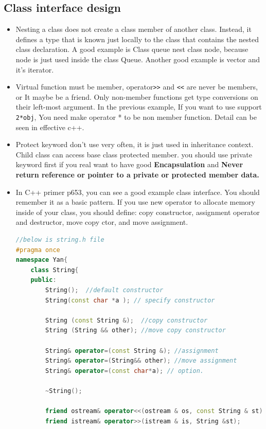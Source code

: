 \documentclass[a4paper,11pt,twoside]{book}
\begin{document}
\subsection{Class interface design}
\begin{itemize}
	
	\item Nesting a class does not create a class member of another class. Instead, it defines a type that is known just locally to the class that contains the nested class declaration.  A good example is Class queue nest class node,  because node is just used inside the class Queue. Another good example is vector and it's iterator.
	
	\item Virtual function must be member, operator\verb=>>= and \verb=<<= are never be members, or It maybe be a friend. Only non-member functions get type conversions on their left-most argument.  In the previous example, If you want to use support \texttt{2*obj}, You need make operator * to be non member function.  Detail can be seen in effective c++.
	
	\item Protect keyword don't use very often, it is just used in inheritance context. Child class can access base class protected member. you should use private keyword first if you real want to have good \textbf{Encapsulation} and \textbf{Never return reference or pointer to a private or protected member data.}
	
	\item In C++ primer p653, you can see a good example class interface. You should remember it as a basic pattern.  If you use new operator to allocate memory inside of your class, you should define: copy constructor, assignment operator and destructor, move copy ctor, and move assignment.
	
\begin{lstlisting}[frame=single, language=c++]
//below is string.h file
#pragma once
namespace Yan{
	class String{
	public:
		String();  //default constructor
		String(const char *a ); // specify constructor
		
		String (const String &);  //copy constructor
		String (String && other); //move copy constructor
		
		String& operator=(const String &); //assignment
		String& operator=(String&& other); //move assignment
		String& operator=(const char*a); // option.
		
		~String();  
		
		friend ostream& operator<<(ostream & os, const String & st);
		friend istream& operator>>(istream & is, String &st);
		

\end{lstlisting}
\end{itemize}
\end{document}
